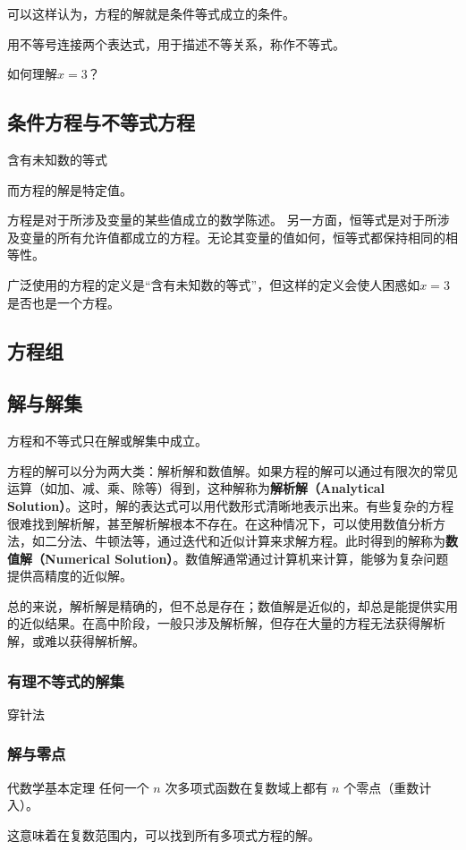 可以这样认为，方程的解就是条件等式成立的条件。







用不等号连接两个表达式，用于描述不等关系，称作不等式。%

如何理解$x=3$？

\subsection{条件方程与不等式方程}

含有未知数的等式


而方程的解是特定值。


方程是对于所涉及变量的某些值成立的数学陈述。
另一方面，恒等式是对于所涉及变量的所有允许值都成立的方程。无论其变量的值如何，恒等式都保持相同的相等性。

广泛使用的方程的定义是“含有未知数的等式”，但这样的定义会使人困惑如$x=3$是否也是一个方程。



\subsection{方程组}

\subsection{解与解集}

方程和不等式只在解或解集中成立。

方程的解可以分为两大类：解析解和数值解。如果方程的解可以通过有限次的常见运算（如加、减、乘、除等）得到，这种解称为\textbf{解析解（Analytical Solution）}。这时，解的表达式可以用代数形式清晰地表示出来。有些复杂的方程很难找到解析解，甚至解析解根本不存在。在这种情况下，可以使用数值分析方法，如二分法、牛顿法等，通过迭代和近似计算来求解方程。此时得到的解称为\textbf{数值解（Numerical Solution）}。数值解通常通过计算机来计算，能够为复杂问题提供高精度的近似解。

总的来说，解析解是精确的，但不总是存在；数值解是近似的，却总是能提供实用的近似结果。在高中阶段，一般只涉及解析解，但存在大量的方程无法获得解析解，或难以获得解析解。

\subsubsection{有理不等式的解集}

穿针法

\subsubsection{解与零点}

\begin{definition}{代数学基本定理}
任何一个 $n$ 次多项式函数在复数域上都有 $n$ 个零点（重数计入）。
\end{definition}
这意味着在复数范围内，可以找到所有多项式方程的解。




